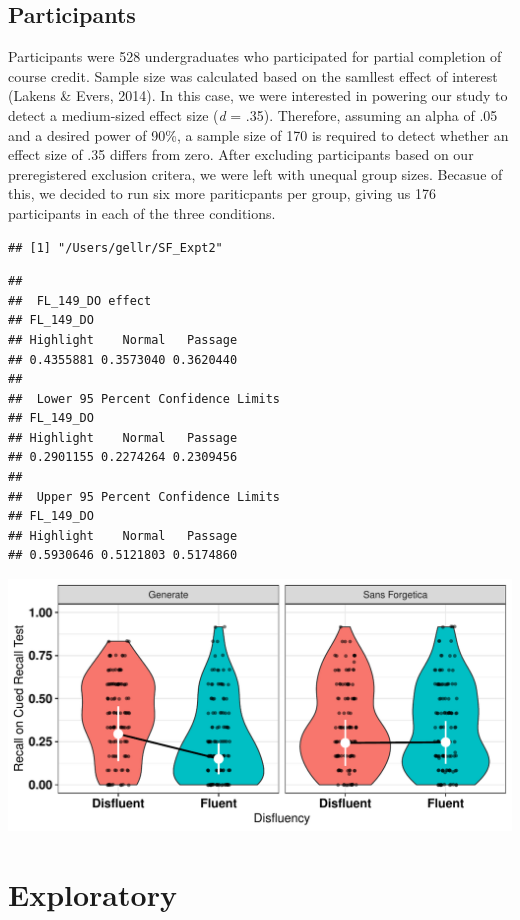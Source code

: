 \documentclass[doc]{apa6}
\begin{document}
\hypertarget{participants-1}{%
\subsection{Participants}\label{participants-1}}

Participants were 528 undergraduates who participated for partial completion of course credit. Sample size was calculated based on the samllest effect of interest (Lakens \& Evers, 2014). In this case, we were interested in powering our study to detect a medium-sized effect size (\emph{d} = .35). Therefore, assuming an alpha of .05 and a desired power of 90\%, a sample size of 170 is required to detect whether an effect size of .35 differs from zero. After excluding participants based on our preregistered exclusion critera, we were left with unequal group sizes. Becasue of this, we decided to run six more pariticpants per group, giving us 176 participants in each of the three conditions.

\begin{verbatim}
## [1] "/Users/gellr/SF_Expt2"
\end{verbatim}

\begin{verbatim}
## 
##  FL_149_DO effect
## FL_149_DO
## Highlight    Normal   Passage 
## 0.4355881 0.3573040 0.3620440 
## 
##  Lower 95 Percent Confidence Limits
## FL_149_DO
## Highlight    Normal   Passage 
## 0.2901155 0.2274264 0.2309456 
## 
##  Upper 95 Percent Confidence Limits
## FL_149_DO
## Highlight    Normal   Passage 
## 0.5930646 0.5121803 0.5174860
\end{verbatim}

\includegraphics{SF_Paper_files/figure-latex/unnamed-chunk-2-1.pdf}

\hypertarget{exploratory}{%
\section{Exploratory}\label{exploratory}}
\end{document}
